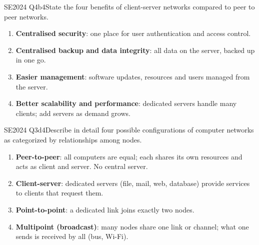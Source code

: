 \documentclass[10pt]{article}
\begin{document}
\begin{pastq}{SE2024 Q4b}{4}State the four benefits of client-server networks compared to peer to peer networks.\end{pastq}
\begin{ans}
\begin{enumerate}
\item \textbf{Centralised security}: one place for user authentication and access control.
\item \textbf{Centralised backup and data integrity}: all data on the server, backed up in one go.
\item \textbf{Easier management}: software updates, resources and users managed from the server.
\item \textbf{Better scalability and performance}: dedicated servers handle many clients; add servers as demand grows.
\end{enumerate}
\end{ans}

\begin{pastq}{SE2024 Q3d}{4}Describe in detail four possible configurations of computer networks as categorized by relationships among nodes.\end{pastq}
\begin{ans}
\begin{enumerate}
\item \textbf{Peer-to-peer}: all computers are equal; each shares its own resources and acts as client and server. No central server.
\item \textbf{Client-server}: dedicated servers (file, mail, web, database) provide services to clients that request them.
\item \textbf{Point-to-point}: a dedicated link joins exactly two nodes.
\item \textbf{Multipoint (broadcast)}: many nodes share one link or channel; what one sends is received by all (bus, Wi-Fi).
\end{enumerate}
\end{ans}
\end{document}
